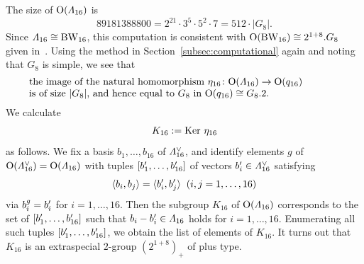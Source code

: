 \documentclass{amsart} %
\begin{document}
%
%
%
 The size of $\mathord{\mathrm{O}}(\varLambda_{16})$ is
 \[
 89181388800=2^{21}\cdot 3^5\cdot 5^2\cdot 7=512\cdot |G_8|.
 \]
 Since $\varLambda_{16}\cong \mathrm{BW}_{16}$, 
this computation is consistent with $\mathord{\mathrm{O}}(\mathrm{BW}_{16})\cong 2^{1+8}.G_8$
given in~\cite[Chapter 4, Section 10]{theCSbook}.
Using the method in Section~\ref{subsec:computational} again
and noting that $G_8$ is simple,
we see that 
%
\begin{equation}\label{eq:Imageeta16}
\parbox{11cm}{
\textrm{%
the image of 
the natural homomorphism $\eta_{16}\colon \OG(\Lamsxtn)\to \OG(q_{16})$ \\
 is of size $|G_8|$, and hence 
equal to $G_8$ in $\OG(q_{16})\cong G_8.2$.
}
}
\end{equation}
%
%
We calculate
\[
K_{16}:=\operatorname{Ker} \,\eta_{16}
\]
as follows.
We  fix a basis 
$b_1, \dots, b_{16}$  of $\varLambda_{16}^{\vee}$, 
and identify elements $g$ of $\mathord{\mathrm{O}}( \varLambda_{16}^{\vee})=\mathord{\mathrm{O}}( \varLambda_{16})$
with tuples $[b_1^{\prime}, \dots, b_{16}^{\prime}]$ of vectors 
$b_i^{\prime}\in \varLambda_{16}^{\vee}$
satisfying
\[
\langle b_i, b_j \rangle=\langle b_i^{\prime}, b_j^{\prime} \rangle \;\;(i, j=1, \dots, 16)
\]
via  $b_i^g=b_i^{\prime}$ for $i=1, \dots, 16$.
Then 
the subgroup
$K_{16}$ of $\mathord{\mathrm{O}}( \varLambda_{16})$
corresponds to the set of 
$[b_1^{\prime}, \dots, b_{16}^{\prime}]$
such that $b_i-b_i^{\prime}\in \varLambda_{16}$ holds for $i=1, \dots, 16$.
Enumerating all such tuples $[b_1^{\prime}, \dots, b_{16}^{\prime}]$,
we obtain the list of elements of $K_{16}$.
It turns out that 
$K_{16}$ is an extraspecial $2$-group $(2^{1+8})_{+}$ of plus type.
%
\end{document}
